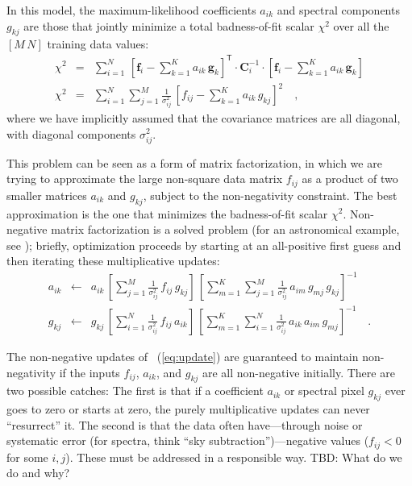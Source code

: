 \documentclass[preprint]{aastex}
\newcounter{address}
\newcommand{\mmatrix}[1]{\boldsymbol{#1}}
\newcommand{\inverse}[1]{{#1}^{-1}}
\newcommand{\transpose}[1]{{#1}^{\mathsf{T}}}
\newcommand{\covar}{\mmatrix{C}}
\newcommand{\fvec}{\mmatrix{f}}
\newcommand{\gvec}{\mmatrix{g}}
\newcommand{\invvar}{\inverse{\covar}}
\begin{document}
In this model, the maximum-likelihood coefficients $a_{ik}$ and
spectral components $g_{kj}$ are those that jointly minimize a total
badness-of-fit scalar $\chi^2$ over all the $[M\,N]$ training data
values:
\begin{eqnarray}\displaystyle
\chi^2 &=& \sum_{i=1}^N 
 \,\transpose{\left[\fvec_i - \sum_{k=1}^K a_{ik}\,\gvec_k\right]}
 \cdot\invvar_i\cdot\left[\fvec_i - \sum_{k=1}^K a_{ik}\,\gvec_k\right]
 \nonumber\\
\chi^2 &=& \sum_{i=1}^N \sum_{j=1}^M \frac{1}{\sigma_{ij}^2}
 \,\left[f_{ij} - \sum_{k=1}^K a_{ik}\,g_{kj}\right]^2
\quad ,
\end{eqnarray}
where we have implicitly assumed that the covariance matrices are all
diagonal, with diagonal components $\sigma_{ij}^2$.

This problem can be seen as a form of matrix factorization, in which
we are trying to approximate the large non-square data matrix $f_{ij}$
as a product of two smaller matrices $a_{ik}$ and $g_{kj}$, subject to
the non-negativity constraint.  The best approximation is the one that
minimizes the badness-of-fit scalar $\chi^2$.  Non-negative matrix
factorization is a solved problem (for an astronomical example, see
\citealt{kcorrect}); briefly, optimization proceeds by starting
at an all-positive first guess and then iterating these multiplicative
updates:
\begin{eqnarray}\displaystyle
a_{ik} &\leftarrow& a_{ik}
 \,\left[\sum_{j=1}^M\frac{1}{\sigma_{ij}^2}\,f_{ij}\,g_{kj}\right]
 \,\left[\sum_{m=1}^K\sum_{j=1}^M\frac{1}{\sigma_{ij}^2}\,a_{im}\,g_{mj}\,g_{kj}\right]^{-1}
\nonumber\\
g_{kj} &\leftarrow& g_{kj}
 \,\left[\sum_{i=1}^N\frac{1}{\sigma_{ij}^2}\,f_{ij}\,a_{ik}\right]
 \,\left[\sum_{m=1}^K\sum_{i=1}^N\frac{1}{\sigma_{ij}^2}\,a_{ik}\,a_{im}\,g_{mj}\right]^{-1}
\quad.\label{eq:update}
\end{eqnarray}

The non-negative updates of \equationname~(\ref{eq:update}) are
guaranteed to maintain non-negativity if the inputs $f_{ij}$,
$a_{ik}$, and $g_{kj}$ are all non-negative initially.  There are two
possible catches: The first is that if a coefficient $a_{ik}$ or
spectral pixel $g_{kj}$ ever goes to zero or starts at zero, the
purely multiplicative updates can never ``resurrect'' it.  The second
is that the data often have---through noise or systematic error (for
spectra, think ``sky subtraction'')---negative values ($f_{ij}<0$ for
some $i,j$).  These must be addressed in a responsible way.  TBD: What
do we do and why?
\end{document}

